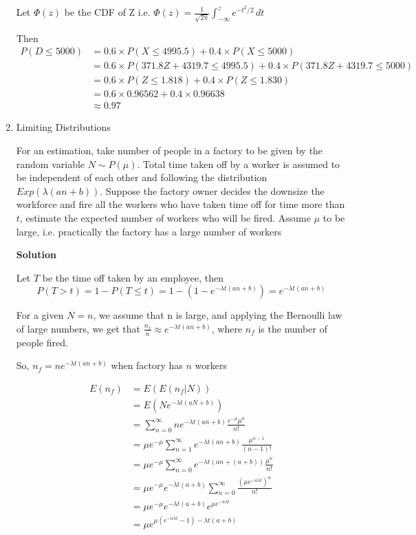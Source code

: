 \documentclass[12pt, oneside]{article}
\begin{document}
\begin{enumerate}
{    Let \(\Phi(z)\) be the CDF of Z i.e. \(\Phi(z) = \frac{1}{\sqrt{2\pi}} \int_{-\infty}^{z} e^{-t^2/2} \,dt\)

    Then
    \begin{align*}
        P(D \leq 5000) &= 0.6 \times P(X \leq 4995.5) + 0.4 \times P(X \leq 5000) \\
            &= 0.6 \times P(371.8 Z + 4319.7 \leq 4995.5) + 0.4 \times P(371.8 Z + 4319.7 \leq 5000) \\
            &= 0.6 \times P(Z \leq 1.818) + 0.4 \times P(Z \leq 1.830) \\
            &= 0.6 \times 0.96562 + 0.4 \times 0.96638 \\
            &\approx 0.97
    \end{align*}

}

\item {
    Limiting Distributions

    For an estimation, take number of people in a factory to be given by the random variable
    \(N \sim P(\mu)\). Total time taken off by a worker is assumed to be independent of each other
    and following the distribution \(Exp(\lambda (an + b))\). Suppose
    the factory owner decides the downsize the workforce and fire all the workers who have taken
    time off for time more than \(t\), estimate the expected number of workers who will be fired.
    Assume \(\mu\) to be large, i.e. practically the factory has a large number of workers

    \textbf{Solution}

    Let \(T\) be the time off taken by an employee, then
    \[
        P(T > t) = 1 - P(T \leq t) = 1 - (1 - e^{-\lambda t(an + b)}) = e^{-\lambda t(an + b)}
    \]

    For a given \(N = n\), we assume that n is large, and applying the Bernoulli law of
    large numbers, we get that \(\frac{n_f}{n} \approx e^{-\lambda t(an + b)}\), 
    where \(n_f\) is the number of people fired.

    So, \(n_f = n e^{-\lambda t(an + b)}\) when factory has \(n\) workers

    \begin{align*}
        E(n_f) &= E(E(n_f | N)) \\
               &= E(N e^{-\lambda t(aN + b)}) \\
               &= \sum_{n = 0}^{\infty} n e^{-\lambda t(an + b)} \frac{e^{-\mu} \mu^n}{n!} \\
               &= \mu e^{-\mu} \sum_{n = 1}^{\infty} e^{-\lambda t(an + b)} \frac{\mu^{n-1}}{(n-1)!} \\
               &= \mu e^{-\mu} \sum_{n = 0}^{\infty} e^{-\lambda t(an + (a + b))} \frac{\mu^{n}}{n!} \\
               &= \mu e^{-\mu} e^{-\lambda t(a + b)} \sum_{n = 0}^{\infty} \frac{(\mu e^{-a \lambda t})^n}{n!} \\
               &= \mu e^{-\mu} e^{-\lambda t(a + b)} e^{\mu e^{-a \lambda t}} \\
               &= \mu e^{\mu(e^{-a \lambda t} - 1) - \lambda t (a + b)}
    \end{align*}
}



\end{enumerate}
\end{document}
